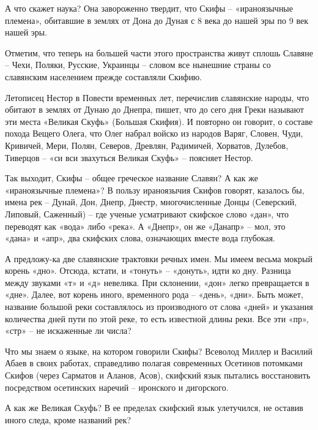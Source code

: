 А что скажет наука? Она завороженно твердит, что Скифы – «ираноязычные племена», обитавшие в землях от Дона до Дуная с 8 века до нашей эры по 9 век нашей эры.

Отметим, что теперь на большей части этого пространства живут сплошь Славяне – Чехи, Поляки, Русские, Украинцы – словом все нынешние страны со славянским населением прежде составляли Скифию.

Летописец Нестор в Повести временных лет, перечислив славянские народы, что обитают в землях от Дунаю до Днепра, пишет, что до сего дня Греки называют эти места «Великая Скуфь» (Большая Скифия). И повторно он говорит, о составе похода Вещего Олега, что Олег набрал войско из народов Варяг, Словен, Чуди, Кривичей, Мери, Полян, Северов, Древлян, Радимичей, Хорватов, Дулебов, Тиверцов – «си вси звахуться Великая Скуфь» – поясняет Нестор.

Так выходит, Скифы – общее греческое название Славян? А как же «ираноязычные племена»? В пользу ираноязычия Скифов говорят, казалось бы, имена рек – Дунай, Дон, Днепр, Днестр, многочисленные Донцы (Северский, Липовый, Саженный) – где ученые усматривают скифское слово «дан», что переводят как «вода» либо «река». А «Днепр», он же «Данапр» – мол, это «дана» и «апр», два скифских слова, означающих вместе вода глубокая.

А предложу-ка две славянские трактовки речных имен. Мы имеем весьма мокрый корень «дно». Отсюда, кстати, и «тонуть» – «донуть», идти ко дну. Разница между звуками «т» и «д» невелика. При склонении, «дон» легко превращается в «дне». Далее, вот корень иного, временного рода – «день», «дни». Быть может, название большой реки составлялось из производного от слова «дней» и указания количества дней пути по этой реке, то есть известной длины реки. Все эти «пр», «стр» – не искаженные ли числа?

Что мы знаем о языке, на котором говорили Скифы? Всеволод Миллер и Василий Абаев в своих работах, справедливо полагая современных Осетинов потомками Скифов (через Сарматов и Аланов, Асов), скифский язык пытались восстановить посредством осетинских наречий – иронского и дигорского. 

А как же Великая Скуфь? В ее пределах скифский язык улетучился, не оставив иного следа, кроме названий рек?




